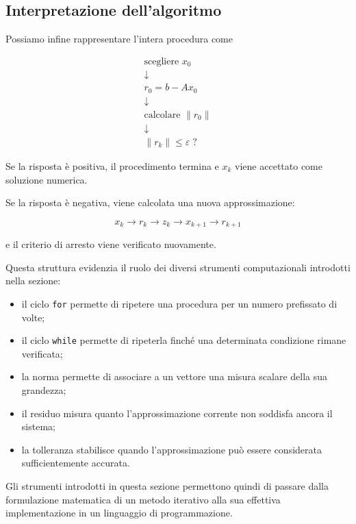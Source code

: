 \subsection{Interpretazione dell'algoritmo}

Possiamo infine rappresentare l'intera procedura come

\begin{equation*}
\boxed{
\begin{array}{c}
\text{scegliere }x_0\\
\downarrow\\
r_0=b-Ax_0\\
\downarrow\\
\text{calcolare }\|r_0\|\\
\downarrow\\
\|r_k\|\leq\varepsilon\;?
\end{array}}
\end{equation*}

Se la risposta è positiva, il procedimento termina e $x_k$ viene
accettato come soluzione numerica.

Se la risposta è negativa, viene calcolata una nuova
approssimazione:

\begin{equation*}
\boxed{
x_k
\longrightarrow
r_k
\longrightarrow
z_k
\longrightarrow
x_{k+1}
\longrightarrow
r_{k+1}
}
\end{equation*}

e il criterio di arresto viene verificato nuovamente.

Questa struttura evidenzia il ruolo dei diversi strumenti
computazionali introdotti nella sezione:

\begin{itemize}
    \item il ciclo \texttt{for} permette di ripetere una procedura
          per un numero prefissato di volte;
    \item il ciclo \texttt{while} permette di ripeterla finché
          una determinata condizione rimane verificata;
    \item la norma permette di associare a un vettore una misura
          scalare della sua grandezza;
    \item il residuo misura quanto l'approssimazione corrente non
          soddisfa ancora il sistema;
    \item la tolleranza stabilisce quando l'approssimazione può
          essere considerata sufficientemente accurata.
\end{itemize}

Gli strumenti introdotti in questa sezione permettono quindi di
passare dalla formulazione matematica di un metodo iterativo alla
sua effettiva implementazione in un linguaggio di programmazione.

